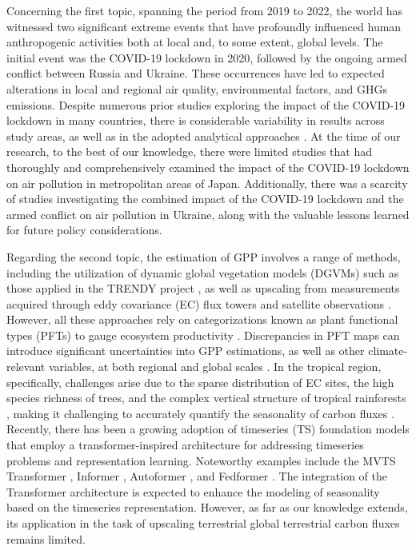 Concerning the first topic, spanning the period from 2019 to 2022, the world has witnessed two significant extreme events that have profoundly influenced human anthropogenic activities both at local and, to some extent, global levels. The initial event was the COVID-19 lockdown in 2020, followed by the ongoing armed conflict between Russia and Ukraine. These occurrences have led to expected alterations in local and regional air quality, environmental factors, and GHGs emissions. Despite numerous prior studies exploring the impact of the COVID-19 lockdown in many countries, there is considerable variability in results across study areas, as well as in the adopted analytical approaches \citep{shi2021abrupt}. At the time of our research, to the best of our knowledge, there were limited studies that had thoroughly and comprehensively examined the impact of the COVID-19 lockdown on air pollution in metropolitan areas of Japan. Additionally, there was a scarcity of studies investigating the combined impact of the COVID-19 lockdown and the armed conflict on air pollution in Ukraine, along with the valuable lessons learned for future policy considerations.\par

Regarding the second topic, the estimation of GPP involves a range of methods, including the utilization of dynamic global vegetation models (DGVMs) such as those applied in the TRENDY project \citep{sitch2015recent, le2018global}, as well as upscaling from measurements acquired through eddy covariance (EC) flux towers and satellite observations \citep{jung2019fluxcom, zeng2020global}. However, all these approaches rely on categorizations known as plant functional types (PFTs) to gauge ecosystem productivity \citep{poulter2011plant, poulter2015plant, lin2021improved, guo2023estimating, yan2023integrating}. Discrepancies in PFT maps can introduce significant uncertainties into GPP estimations, as well as other climate-relevant variables, at both regional and global scales \citep{poulter2011plant}. In the tropical region, specifically, challenges arise due to the sparse distribution of EC sites, the high species richness of trees, and the complex vertical structure of tropical rainforests \citep{montgomery2001forest}, making it challenging to accurately quantify the seasonality of carbon fluxes \citep{xu2015satellite}. Recently, there has been a growing adoption of timeseries (TS) foundation models that employ a transformer-inspired architecture for addressing timeseries problems and representation learning. Noteworthy examples include the MVTS Transformer \citep{zerveas2021transformer}, Informer \citep{zhou2021informer}, Autoformer \citep{wu2021autoformer}, and Fedformer \citep{zhou2022fedformer}. The integration of the Transformer architecture is expected to enhance the modeling of seasonality based on the timeseries representation. However, as far as our knowledge extends, its application in the task of upscaling terrestrial global terrestrial carbon fluxes remains limited. \par

